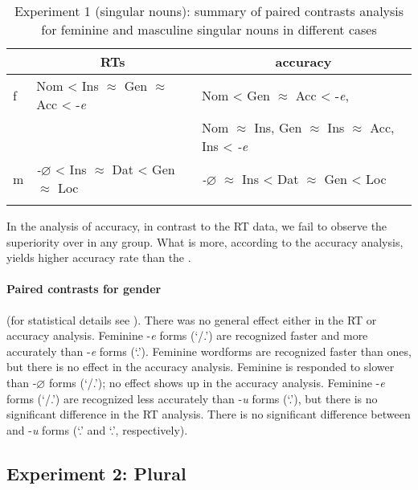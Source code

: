 \documentclass[output=paper, modfonts,newtxmath,hidelinks]{langscibook}
\begin{document}
\begin{table}
	\caption{Experiment 1 (singular nouns): summary of paired contrasts analysis for feminine and masculine singular nouns in different cases}
    \label{tab:caseSgHierarchy}
    \begin{tabular}{*{3}l}
    \lsptoprule
    ~	&	\multicolumn{1}{c}{RTs}	&	\multicolumn{1}{c}{accuracy}\\
    \midrule
    f	&	Nom < Ins $\approx$ Gen $\approx$ Acc < -\textit{e}	&	Nom < Gen $\approx$ Acc < -\textit{e}, \\
    ~	&	~	&	Nom $\approx$ Ins, Gen $\approx$ Ins $\approx$ Acc, Ins < \textit{-e}\\
    m	&	\textit{-$\varnothing$} < Ins $\approx$ Dat < Gen $\approx$ Loc	&	\textit{-$\varnothing$} $\approx$ Ins < Dat $\approx$ Gen  < Loc			\\
    \lspbottomrule
    \end{tabular}
\end{table}

In the analysis of accuracy, in contrast to the RT data, we fail to observe the  superiority over  in any  group. What is more, according to the accuracy analysis,   yields higher accuracy rate than the  . 

\paragraph*{Paired contrasts for gender} (for statistical details see ). There was no general  effect either in the RT or accuracy analysis. Feminine -\textit{e} forms (`\datt/\locc.\fem') are recognized faster and more accurately than  -\textit{e} forms (`\locc.\masc'). Feminine  wordforms are recognized faster than  ones, but there is no effect in the accuracy analysis. Feminine  is responded to slower than  -$\varnothing$ forms (`\nomm/\accc.\masc'); no effect shows up in the accuracy analysis. Feminine -\textit{e} forms (`\datt/\locc.\fem') are recognized less accurately than  -\textit{u}  forms (`\datt.\masc'), but there is no significant difference in the RT analysis. There is no significant difference between  and  -\textit{u} forms (`\accc.\fem' and `\datt.\masc', respectively).

\subsection{Experiment 2: Plural}
\end{document}
